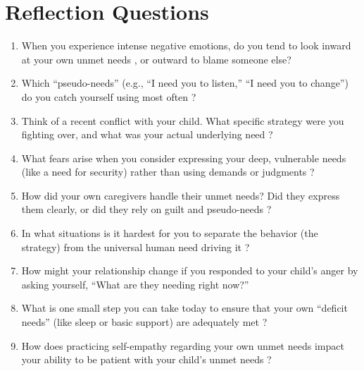 \section{Reflection Questions}
\begin{reflection}
\small
\begin{enumerate}[itemsep=0pt, parsep=0pt, topsep=0pt]
  \item When you experience intense negative emotions, do you tend to look inward at your own unmet needs \citep{rizzolatti2004}, or outward to blame someone else?
  \item Which ``pseudo-needs'' (e.g., ``I need you to listen,'' ``I need you to change'') do you catch yourself using most often \citep{streubel2021}?
  \item Think of a recent conflict with your child. What specific strategy were you fighting over, and what was your actual underlying need \citep{lobue2022}?
  \item What fears arise when you consider expressing your deep, vulnerable needs (like a need for security) rather than using demands or judgments \citep{christou2025}?
  \item How did your own caregivers handle their unmet needs? Did they express them clearly, or did they rely on guilt and pseudo-needs \citep{ruba2020}?
  \item In what situations is it hardest for you to separate the behavior (the strategy) from the universal human need driving it \citep{aghaziarati2023}?
  \item How might your relationship change if you responded to your child's anger by asking yourself, ``What are they needing right now?'' \citep{izard2001}
  \item What is one small step you can take today to ensure that your own ``deficit needs'' (like sleep or basic support) are adequately met \citep{herman2025}?
  \item How does practicing self-empathy regarding your own unmet needs impact your ability to be patient with your child's unmet needs \citep{hoffman2000}?
\end{enumerate}
\end{reflection}
